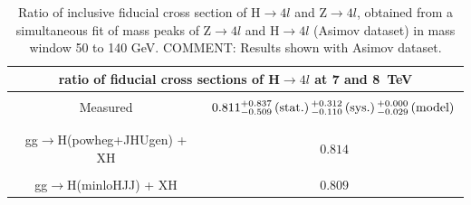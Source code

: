 \begin{table}[!h!tb]
\begin{center}
      \caption{
Ratio of inclusive fiducial cross section of H$\rightarrow 4l$ and Z$\rightarrow 4l$, obtained
from a simultaneous fit of mass peaks of Z$\rightarrow 4l$ and H$\rightarrow 4l$ (Asimov dataset) in mass window 50 to 140 GeV.
    COMMENT: Results shown with Asimov dataset.
        } \label{tab:incresults-simfit-asimov}
\begin{tabular}{|c|c|}
\hline %
\hline %
\multicolumn{2}{|c|}{ ratio of fiducial cross sections of H$\rightarrow 4l$ at 7 and 8~TeV} \\
\hline %
\vspace{-0.4cm} & \\
Measured & $0.811^{\rm +0.837}_{\rm -0.509} \, {\rm(stat.)}\, ^{\rm +0.312}_{\rm -0.110}\,  {\rm (sys.)} \, ^{+0.000}_{-0.029}\,  {\rm (model)}\,$  \\
\vspace{-0.4cm} & \\
\hline %
\vspace{-0.4cm} & \\
\small gg$\rightarrow$H({\sc powheg+JHUgen}) + XH & $0.814$ \\
\hline %
\vspace{-0.4cm} & \\
\small gg$\rightarrow$H({\sc minloHJJ}) + XH & $0.809$ \\
\hline %
\hline %
\end{tabular}
\end{center}
\end{table}
